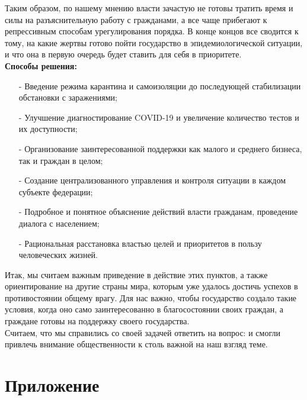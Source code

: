 \documentclass[a4paper, 12pt]{extarticle}
\begin{document}
Таким образом, по нашему мнению власти зачастую не готовы тратить время и силы на разъяснительную работу с гражданами, а все чаще прибегают к репрессивным способам урегулирования порядка. В конце концов все сводится к тому, на какие жертвы готово пойти государство в эпидемиологической ситуации, и что она в первую очередь будет ставить для себя в приоритете.
\\

\textbf{Способы решения:}
\begin{itemize}
    \item[-] Введение режима карантина и самоизоляции до последующей стабилизации обстановки с заражениями;

    \item[-] Улучшение диагностирование COVID-19 и увеличение количество тестов и их доступности;

    \item[-] Организование заинтересованной поддержки как малого и среднего бизнеса, так и граждан в целом;

    \item[-] Создание централизованного управления и контроля ситуации в каждом субъекте федерации;

    \item[-] Подробное и понятное объяснение действий власти гражданам, проведение диалога с населением;

    \item[-] Рациональная расстановка властью целей и приоритетов в пользу человеческих жизней.

\end{itemize}

Итак, мы считаем важным приведение в действие этих пунктов, а также ориентирование на другие страны мира, которым уже удалось достичь успехов в противостоянии общему врагу. Для нас важно, чтобы государство создало такие условия, когда оно само заинтересованно в благосостоянии своих граждан, а граждане готовы на поддержку своего государства.
\\

Считаем, что мы справились со своей задачей ответить на вопрос:  и смогли привлечь внимание общественности к столь важной на наш взгляд теме.
\newpage


\section*{Приложение}
\newpage

{}

\end{document}
